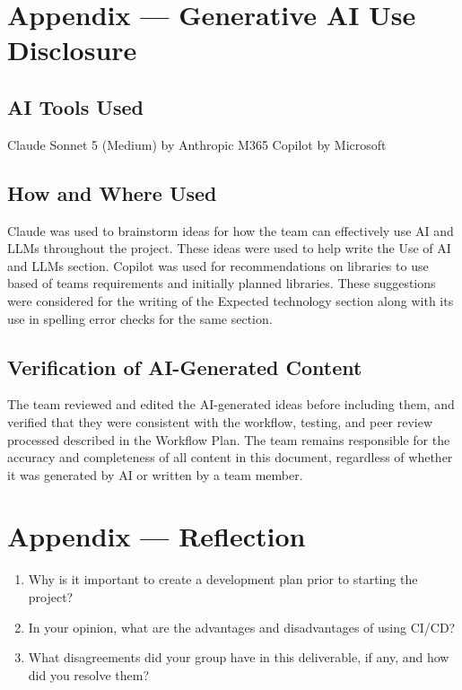 \documentclass{article}
\begin{document}
\newpage{}

\section{Appendix --- Generative AI Use Disclosure}

\subsection{AI Tools Used}

Claude Sonnet 5 (Medium) by Anthropic
M365 Copilot by Microsoft
\subsection{How and Where Used}

Claude was used to brainstorm ideas for how the team can effectively use AI and LLMs throughout the project. These ideas were used to help write the Use of AI and LLMs section.
Copilot was used for recommendations on libraries to use based of teams requirements and initially planned libraries. These suggestions were considered for the writing of the Expected technology section along with its use in spelling error checks for the same section.
\subsection{Verification of AI-Generated Content}

The team reviewed and edited the AI-generated ideas before including them, and verified that they were consistent with the workflow, testing, and peer review processed described in the Workflow Plan. The team remains responsible for the accuracy and completeness of all content in this document, regardless of whether it was generated by AI or written by a team member.

\newpage{}

\section*{Appendix --- Reflection}



\begin{enumerate}
    \item Why is it important to create a development plan prior to starting the
    project?
    \item In your opinion, what are the advantages and disadvantages of using
    CI/CD?
    \item What disagreements did your group have in this deliverable, if any,
    and how did you resolve them?
\end{enumerate}
\end{document}
